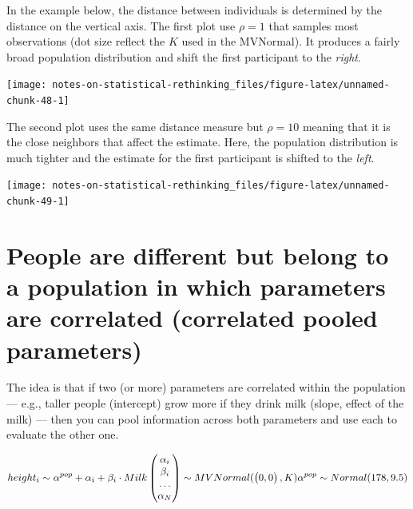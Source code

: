 \documentclass[
]{book}
\begin{document}
In the example below, the distance between individuals is determined by the distance on the vertical axis. The first plot use \(\rho=1\) that samples most observations (dot size reflect the \(K\) used in the MVNormal). It produces a fairly broad population distribution and shift the first participant to the \emph{right}.

\begin{center}\texttt{[image: notes-on-statistical-rethinking\_files/figure-latex/unnamed-chunk-48-1]} \end{center}

The second plot uses the same distance measure but \(\rho=10\) meaning that it is the close neighbors that affect the estimate. Here, the population distribution is much tighter and the estimate for the first participant is shifted to the \emph{left}.

\begin{center}\texttt{[image: notes-on-statistical-rethinking\_files/figure-latex/unnamed-chunk-49-1]} \end{center}

\hypertarget{people-are-different-but-belong-to-a-population-in-which-parameters-are-correlated-correlated-pooled-parameters}{%
\section{People are different but belong to a population in which parameters are correlated (correlated pooled parameters)}\label{people-are-different-but-belong-to-a-population-in-which-parameters-are-correlated-correlated-pooled-parameters}}

The idea is that if two (or more) parameters are correlated within the population --- e.g., taller people (intercept) grow more if they drink milk (slope, effect of the milk) --- then you can pool information across both parameters and use each to evaluate the other one.

\[height_i \sim \alpha^{pop} + \alpha_i + \beta_i \cdot Milk\\
\begin{pmatrix} \alpha_i \\ \beta_i \\ \dots \\ \alpha_N \end{pmatrix} \sim MVNormal(
 \begin{pmatrix}0, 0 \end{pmatrix}, K) \\
\alpha^{pop} \sim Normal(178, 9.5)\]
\end{document}
